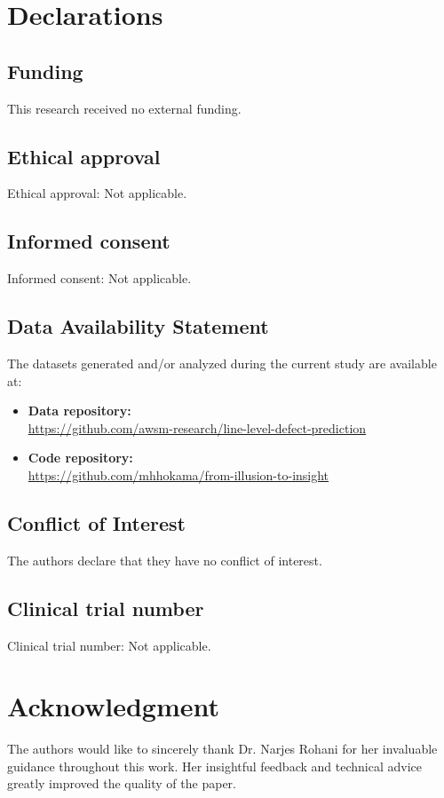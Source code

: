 \documentclass[authoryear,final,5p,times,twocolumn]{elsarticle}
\theoremstyle{plain}
\begin{document}
\section{Declarations}

\subsection{Funding}
This research received no external funding.

\subsection{Ethical approval}
Ethical approval: Not applicable.

\subsection{Informed consent}
Informed consent: Not applicable.

\subsection{Data Availability Statement}
The datasets generated and/or analyzed during the current study are available at:
\begin{itemize}
    \item \textbf{Data repository:}\\ \url{https://github.com/awsm-research/line-level-defect-prediction}
    \item \textbf{Code repository:}\\ \url{https://github.com/mhhokama/from-illusion-to-insight}
\end{itemize}

\subsection{Conflict of Interest}
The authors declare that they have no conflict of interest.

\subsection{Clinical trial number}
Clinical trial number: Not applicable.

\section{Acknowledgment}
The authors would like to sincerely thank Dr. Narjes Rohani for her invaluable guidance throughout this work. Her insightful feedback and technical advice greatly improved the quality of the paper.
\end{document}
